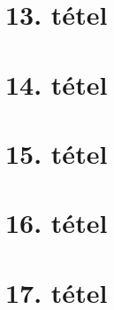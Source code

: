 \documentclass[ebook]{memoir}
\begin{document}
\section{13. tétel}

\newpage
\section{14. tétel}

\newpage
\section{15. tétel}

\newpage
\section{16. tétel}

\newpage
\section{17. tétel}

\end{document}
